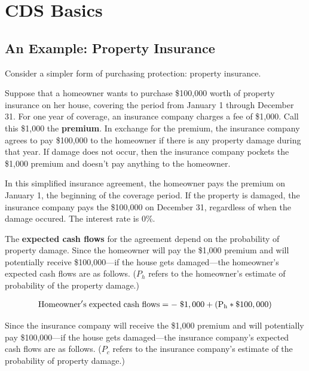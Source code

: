 \documentclass[article]{jss}
\begin{document}
\section{CDS Basics}
\label{sec:CDSBasics}

\subsection{An Example: Property Insurance}
\label{sec:PropInsurance}


Consider a simpler form of purchasing protection: property insurance. 

Suppose that a homeowner wants to purchase \$100,000 worth of property insurance on her house, covering the period from January 1 through December 31. For one year of coverage, an insurance company charges a fee of \$1,000. Call this \$1,000 the \textbf{premium}. In exchange for the premium, the insurance company agrees to pay \$100,000 to the homeowner if there is any property damage during that year. If damage does not occur, then the insurance company pockets the \$1,000 premium and doesn't pay anything to the homeowner. 

In this simplified insurance agreement, the homeowner pays the premium on January 1, the beginning of the coverage period. If the property is damaged, the insurance company pays the \$100,000 on December 31, regardless of when the damage occured. The interest rate is 0\%.

The \textbf{expected cash flows} for the agreement depend on the probability of property damage. Since the homeowner will pay the \$1,000 premium and will potentially receive \$100,000---if the house gets damaged---the homeowner's expected cash flows are as follows. ($P_h$ refers to the homeowner's estimate of probability of the property damage.)

\begin{equation}
 \begin{aligned}
   {\rm Homeowner's\hspace{3pt}expected\hspace{3pt}cash\hspace{3pt}flows = -\hspace{3pt}\$1,000 + (P_h * {\$100,000})}
    \end{aligned}
    \label{eqn:homeownerECF}
\end{equation}

Since the insurance company will receive the \$1,000 premium and will potentially pay \$100,000---if the house gets damaged---the insurance company's expected cash flows are as follows. ($P_c$ refers to the insurance company's estimate of the probability of property damage.)
\end{document}

